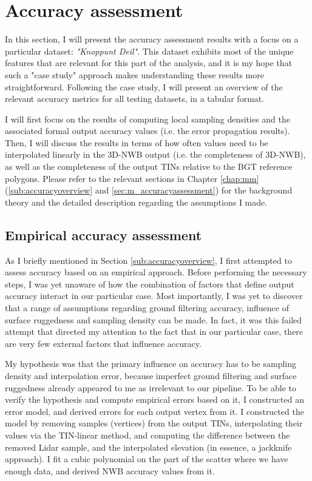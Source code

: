 \section{Accuracy assessment}
\label{sec:accuracy}

In this section, I will present the accuracy assessment results with a focus on a particular dataset: \textit{"Knoppunt Deil"}. This dataset exhibits most of the unique features that are relevant for this part of the analysis, and it is my hope that such a "case study" approach makes understanding these results more straightforward. Following the case study, I will present an overview of the relevant accuracy metrics for all testing datasets, in a tabular format.

I will first focus on the results of computing local sampling densities and the associated formal output accuracy values (i.e. the error propagation results). Then, I will discuss the results in terms of how often values need to be interpolated linearly in the 3D-NWB output (i.e. the completeness of 3D-NWB), as well as the completeness of the output TINs relative to the BGT reference polygons. Please refer to the relevant sections in Chapter \ref{chap:mm} (\ref{sub:accuracyoverview} and \ref{sec:m_accuracyassessment}) for the background theory and the detailed description regarding the assumptions I made.

\subsection{Empirical accuracy assessment}
\label{sub:accuracyempirical}

As I briefly mentioned in Section \ref{sub:accuracyoverview}, I first attempted to assess accuracy based on an empirical approach. Before performing the necessary steps, I was yet unaware of how the combination of factors that define output accuracy interact in our particular case. Most importantly, I was yet to discover that a range of assumptions regarding ground filtering accuracy, influence of surface ruggedness and sampling density can be made. In fact, it was this failed attempt that directed my attention to the fact that in our particular case, there are very few external factors that influence accuracy.

My hypothesis was that the primary influence on accuracy has to be sampling density and interpolation error, because imperfect ground filtering and surface ruggedness already appeared to me as irrelevant to our pipeline. To be able to verify the hypothesis and compute empirical errors based on it, I constructed an error model, and derived errors for each output vertex from it. I constructed the model by removing samples (vertices) from the output TINs, interpolating their values via the TIN-linear method, and computing the difference between the removed Lidar sample, and the interpolated elevation (in essence, a jackknife approach). I fit a cubic polynomial on the part of the scatter where we have enough data, and derived NWB accuracy values from it.

